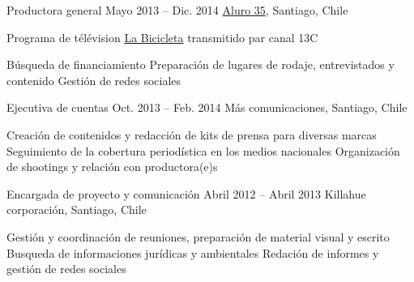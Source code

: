 \begin{joblist}
{{\begin{itemize}
			\end{itemize}     
        }
	}
    
    
    
\item[Productora general]{Mayo 2013 -- Dic. 2014}
     {     
     \href{https://www.aluro35.com/}  {Aluro 35}, Santiago, Chile
     }
     {Programa de télévision \href{http://www.13.cl/c/programas/la-bicicleta}{La Bicicleta} transmitido par canal 13C \\
		\normalsize{
		\iftbftiny \vspace{-0.5cm} \fi
			\begin{itemize}
			  \iftbftiny \setlength\itemsep{-3pt} \fi
			  \cvitem[\checkmark] Búsqueda de financiamiento                
			  \cvitem[\checkmark] Preparación de lugares de rodaje, entrevistados y contenido
			  \cvitem[\checkmark] Gestión de redes sociales      
			\end{itemize}     
        }
	}



\item[Ejecutiva de cuentas]{Oct. 2013 -- Feb. 2014 }     
  	{
  	Más comunicaciones, Santiago, Chile
  	}     
  	{
		\normalsize{
		\iftbftiny \vspace{-0.5cm} \fi
		\begin{itemize}
			  \iftbftiny \setlength\itemsep{-3pt} \fi
			  \cvitem[\checkmark]  Creación de contenidos y redacción de kits de prensa para diversas marcas                                       
			  \cvitem[\checkmark]  Seguimiento de la cobertura periodística en los medios nacionales                                          
			  \cvitem[\checkmark]  Organización de shootings y relación con productora(e)s

		\end{itemize}       
        }
	}

\item[Encargada de proyecto y comunicación]{Abril 2012 -- Abril 2013 }     
  	{
  	Killahue corporación, Santiago, Chile
  	}     
  	{
        \normalsize{
		\iftbftiny \vspace{-0.5cm} \fi
		\begin{itemize}
			  \iftbftiny \setlength\itemsep{-3pt} \fi
			  \cvitem[\checkmark] Gestión y coordinación de reuniones, preparación de material visual y escrito                                   
			  \cvitem[\checkmark] Busqueda de informaciones jurídicas y ambientales
			  \cvitem[\checkmark] Redación de informes y gestión de redes sociales                                       
		\end{itemize}  
		}
	}


   

\end{joblist}


